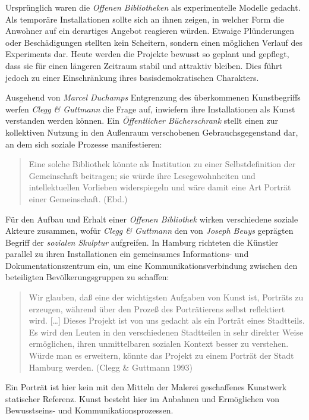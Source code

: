 \documentclass[a4paper,
fontsize=11pt,
oneside,
numbers=noperiodatend,
parskip=half-,
bibliography=totoc,
final
]{scrartcl}
\begin{document}
Ursprünglich waren die \emph{Offenen Bibliotheken} als experimentelle
Modelle gedacht. Als temporäre Installationen sollte sich an ihnen
zeigen, in welcher Form die Anwohner auf ein derartiges Angebot
reagieren würden. Etwaige Plünderungen oder Beschädigungen stellten kein
Scheitern, sondern einen möglichen Verlauf des Experiments dar. Heute
werden die Projekte bewusst so geplant und gepflegt, dass sie für einen
längeren Zeitraum stabil und attraktiv bleiben. Dies führt jedoch zu
einer Einschränkung ihres basisdemokratischen Charakters.

Ausgehend von \emph{Marcel Duchamps} Entgrenzung des überkommenen
Kunstbegriffs werfen \emph{Clegg \& Guttmann} die Frage auf, inwiefern
ihre Installationen als Kunst verstanden werden können. Ein
\emph{Öffentlicher Bücherschrank} stellt einen zur kollektiven Nutzung
in den Außenraum verschobenen Gebrauchsgegenstand dar, an dem sich
soziale Prozesse manifestieren:

\begin{quote}
Eine solche Bibliothek könnte als Institution zu einer Selbstdefinition
der Gemeinschaft beitragen; sie würde ihre Lesegewohnheiten und
intellektuellen Vorlieben widerspiegeln und wäre damit eine Art Porträt
einer Gemeinschaft. (Ebd.)
\end{quote}

Für den Aufbau und Erhalt einer \emph{Offenen Bibliothek} wirken
verschiedene soziale Akteure zusammen, wofür \emph{Clegg \& Guttmann}
den von \emph{Joseph Beuys} geprägten Begriff der \emph{sozialen
Skulptur} aufgreifen. In Hamburg richteten die Künstler parallel zu
ihren Installationen ein gemeinsames Informations- und
Dokumentationszentrum ein, um eine Kommunikationsverbindung zwischen den
beteiligten Bevölkerungsgruppen zu schaffen:

\begin{quote}
Wir glauben, daß eine der wichtigsten Aufgaben von Kunst ist, Porträts
zu erzeugen, während über den Prozeß des Porträtierens selbst
reflektiert wird. {[}\ldots{}{]} Dieses Projekt ist von uns gedacht als
ein Porträt eines Stadtteils. Es wird den Leuten in den verschiedenen
Stadtteilen in sehr direkter Weise ermöglichen, ihren unmittelbaren
sozialen Kontext besser zu verstehen. Würde man es erweitern, könnte das
Projekt zu einem Porträt der Stadt Hamburg werden. (Clegg \& Guttmann
1993)
\end{quote}

Ein Porträt ist hier kein mit den Mitteln der Malerei geschaffenes
Kunstwerk statischer Referenz. Kunst besteht hier im Anbahnen und
Ermöglichen von Bewusstseins- und Kommunikationsprozessen.
\end{document}
